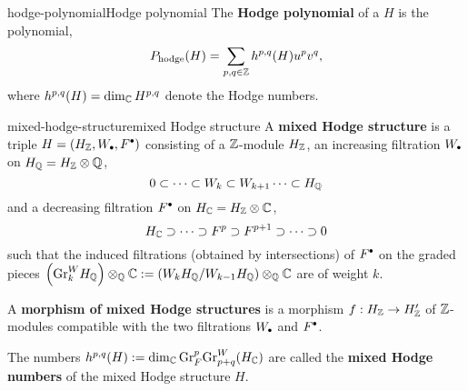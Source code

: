 \begin{topic}{hodge-polynomial}{Hodge polynomial}
    The \textbf{Hodge polynomial} of a  $H$ is the polynomial,
    \[ P_\textup{hodge}(H) = \sum_{p, q \in \mathbb{Z}} h^{p, q}(H) u^p v^q , \]
    where $h^{p, q}(H) = \dim_{\mathbb{C}} H^{p, q}$ denote the Hodge numbers.
\end{topic}

\begin{topic}{mixed-hodge-structure}{mixed Hodge structure}
    A \textbf{mixed Hodge structure} is a triple $H = (H_\ZZ, W_\bdot, F^\bdot)$ consisting of a $\mathbb{Z}$-module $H_{\mathbb{Z}}$, an increasing filtration $W_\bdot$ on $H_{\mathbb{Q}} = H_{\mathbb{Z}} \otimes \mathbb{Q}$,
    \[ 0 \subset \cdots \subset W_k \subset W_{k + 1} \cdots \subset H_{\mathbb{Q}} \]
    and a decreasing filtration $F^\bdot$ on $H_{\mathbb{C}} = H_{\mathbb{Z}} \otimes \mathbb{C}$,
    \[ H_{\mathbb{C}} \supset \cdots \supset F^p \supset F^{p + 1} \supset \cdots \supset 0 \]
    such that the induced filtrations (obtained by intersections) of $F^\bdot$ on the graded pieces $\left(\textup{Gr}^W_k H_{\mathbb{Q}}\right) \otimes_{\mathbb{Q}} \mathbb{C} := \left(W_k H_{\mathbb{Q}} / W_{k - 1} H_{\mathbb{Q}}\right) \otimes_{\mathbb{Q}} \mathbb{C}$ are  of weight $k$.
    
    A \textbf{morphism of mixed Hodge structures} is a morphism $f : H_{\mathbb{Z}} \to H'_{\mathbb{Z}}$ of $\mathbb{Z}$-modules compatible with the two filtrations $W_\bdot$ and $F^\bdot$.
    
    The numbers $h^{p, q}(H) := \dim_{\mathbb{C}} \textup{Gr}_F^p \textup{Gr}^W_{p + q}(H_{\mathbb{C}})$ are called the \textbf{mixed Hodge numbers} of the mixed Hodge structure $H$.
\end{topic}
